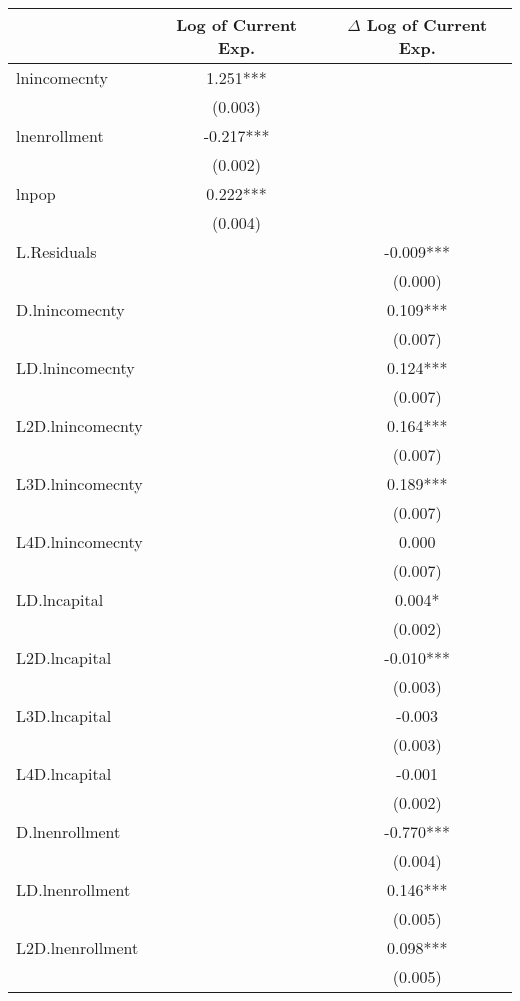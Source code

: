 \begin{tabular}{lcc}
\hline
 & Log of Current Exp. & $\Delta$ Log of Current Exp. \\ 
\hline
lnincomecnty        & 1.251*** &  \\
                    & (0.003)  &  \\
lnenrollment        & -0.217*** &  \\
                    & (0.002)  &  \\
lnpop               & 0.222*** &  \\
                    & (0.004)  &  \\
L.Residuals         &  & -0.009*** \\
                    &  & (0.000) \\
D.lnincomecnty      &  & 0.109*** \\
                    &  & (0.007) \\
LD.lnincomecnty     &  & 0.124*** \\
                    &  & (0.007) \\
L2D.lnincomecnty    &  & 0.164*** \\
                    &  & (0.007) \\
L3D.lnincomecnty    &  & 0.189*** \\
                    &  & (0.007) \\
L4D.lnincomecnty    &  & 0.000 \\
                    &  & (0.007) \\
LD.lncapital        &  & 0.004* \\
                    &  & (0.002) \\
L2D.lncapital       &  & -0.010*** \\
                    &  & (0.003) \\
L3D.lncapital       &  & -0.003 \\
                    &  & (0.003) \\
L4D.lncapital       &  & -0.001 \\
                    &  & (0.002) \\
D.lnenrollment      &  & -0.770*** \\
                    &  & (0.004) \\
LD.lnenrollment     &  & 0.146*** \\
                    &  & (0.005) \\
L2D.lnenrollment    &  & 0.098*** \\
                    &  & (0.005) \\

\end{tabular}
